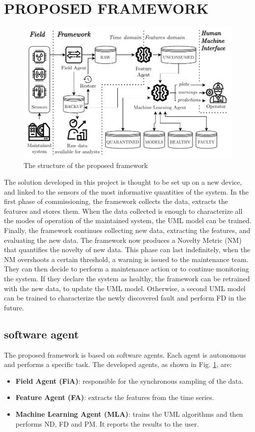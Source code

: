 \section{PROPOSED FRAMEWORK}
\label{sec:framework}
\begin{figure}
    \includegraphics[width=\linewidth]{images/Framework_structure.pdf}
    \caption{The structure of the proposed framework}
    \label{fig:framework_structure}
\end{figure}

The solution developed in this project is thought to be set up on a new device, and linked to the sensors of the most informative quantities of the system.
In the first phase of commissioning, the framework collects the data, extracts the features and stores them. When the data collected is enough to characterize all the modes of operation of the maintained system, the UML model can be trained. Finally, the framework continues collecting new data, extracting the features, and evaluating the new data. The framework now produces a Novelty Metric (NM) that quantifies the novelty of new data. 
This phase can last indefinitely, when the NM overshoots a certain threshold, a warning is issued to the maintenance team. They can then decide to perform a maintenance action or to continue monitoring the system. If they declare the system as healthy, the framework can be retrained with the new data, to update the UML model. Otherwise, a second UML model can be trained to characterize the newly discovered fault and perform FD in the future.

\subsection{software agent}
The proposed framework is based on software agents. Each agent is autonomous and performs a specific task. The developed agents, as shown in Fig. \ref{fig:framework_structure}, are:
\begin{itemize}
    \item \textbf{Field Agent (FiA)}: responsible for the synchronous sampling of the data.
    \item \textbf{Feature Agent (FA)}: extracts the features from the time series.
    \item \textbf{Machine Learning Agent (MLA)}: trains the UML algorithms and then performs ND, FD and PM. It reports the results to the user.
\end{itemize}

